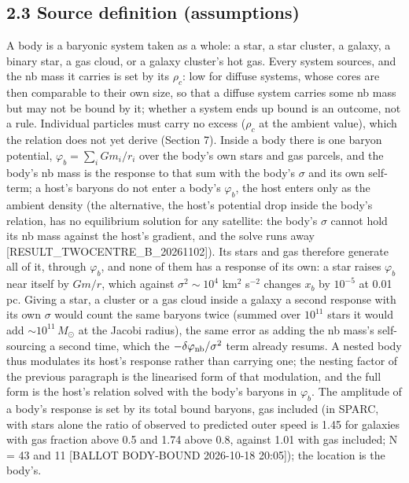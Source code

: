 \documentclass[
  10pt,
]{article}
\begin{document}
\subsection{2.3 Source definition (assumptions)}\label{source-definition-assumptions}

A body is a baryonic system taken as a whole: a star, a star cluster, a galaxy, a binary star, a gas cloud, or a galaxy cluster's hot gas. Every system sources, and the nb mass it carries is set by its $\rho_c$: low for diffuse systems, whose cores are then comparable to their own size, so that a diffuse system carries some nb mass but may not be bound by it; whether a system ends up bound is an outcome, not a rule. Individual particles must carry no excess ($\rho_c$ at the ambient value), which the relation does not yet derive (Section 7). Inside a body there is one baryon potential, $\varphi_b=\sum_i Gm_i/r_i$ over the body's own stars and gas parcels, and the body's nb mass is the response to that sum with the body's $\sigma$ and its own self-term; a host's baryons do not enter a body's $\varphi_b$, the host enters only as the ambient density (the alternative, the host's potential drop inside the body's relation, has no equilibrium solution for any satellite: the body's $\sigma$ cannot hold its nb mass against the host's gradient, and the solve runs away {[}RESULT\_TWOCENTRE\_B\_20261102{]}). Its stars and gas therefore generate all of it, through $\varphi_b$, and none of them has a response of its own: a star raises $\varphi_b$ near itself by $Gm/r$, which against $\sigma^2\sim10^4$ km$^2$ s$^{-2}$ changes $x_b$ by $10^{-5}$ at 0.01 pc. Giving a star, a cluster or a gas cloud inside a galaxy a second response with its own $\sigma$ would count the same baryons twice (summed over $10^{11}$ stars it would add $\sim10^{11}\,M_\odot$ at the Jacobi radius), the same error as adding the nb mass's self-sourcing a second time, which the $-\delta\varphi_{\rm nb}/\sigma^2$ term already resums. A nested body thus modulates its host's response rather than carrying one; the nesting factor of the previous paragraph is the linearised form of that modulation, and the full form is the host's relation solved with the body's baryons in $\varphi_b$. The amplitude of a body's response is set by its total bound baryons, gas included (in SPARC, with stars alone the ratio of observed to predicted outer speed is 1.45 for galaxies with gas fraction above 0.5 and 1.74 above 0.8, against 1.01 with gas included; N = 43 and 11 {[}BALLOT BODY-BOUND 2026-10-18 20:05{]}); the location is the body's.
\end{document}
